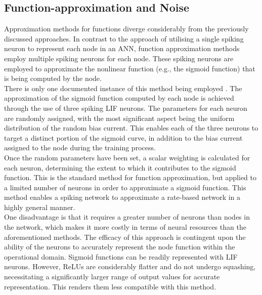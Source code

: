 \subsection[Function-approximation and Noise]{Function-approximation and Noise}

\noindent Approximation methods for functions diverge considerably from the previously discussed approaches. In contrast to the approach of utilising a single spiking neuron to represent each node in an ANN, function approximation methods employ multiple spiking neurons for each node. These spiking neurons are employed to approximate the nonlinear function (e.g., the sigmoid function) that is being computed by the node.\\

\noindent There is only one documented instance of this method being employed \cite{eliasmith2012large}. The approximation of the sigmoid function computed by each node is achieved through the use of three spiking LIF neurons. The parameters for each neuron are randomly assigned, with the most significant aspect being the uniform distribution of the random bias current. This enables each of the three neurons to target a distinct portion of the sigmoid curve, in addition to the bias current assigned to the node during the training process.\\

\noindent Once the random parameters have been set, a scalar weighting is calculated for each neuron, determining the extent to which it contributes to the sigmoid function. This is the standard method for function approximation, but applied to a limited number of neurons in order to approximate a sigmoid function. This method enables a spiking network to approximate a rate-based network in a highly general manner. \\

\noindent One disadvantage is that it requires a greater number of neurons than nodes in the network, which makes it more costly in terms of neural resources than the aforementioned methods. The efficacy of this approach is contingent upon the ability of the neurons to accurately represent the node function within the operational domain. Sigmoid functions can be readily represented with LIF neurons. However, ReLUs are considerably flatter and do not undergo squashing, necessitating a significantly larger range of output values for accurate representation. This renders them less compatible with this method. \\

